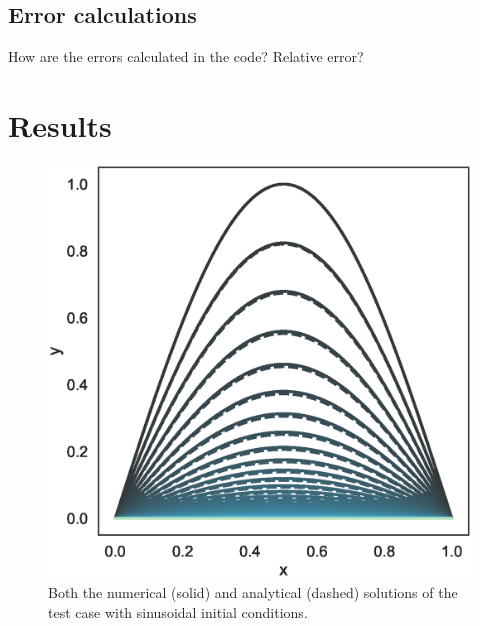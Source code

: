 \documentclass[aps,reprint]{revtex4-1}
\begin{document}
\subsection{Error calculations}
How are the errors calculated in the code? Relative error?
\section{Results} \label{sec:results}
\begin{figure}[ht]
  \centering
  \includegraphics[width=\columnwidth]{figures/sin_numeric_vs_analytical.eps}
  \caption{\label{fig:sinnumanalytic} Both the numerical (solid) and analytical
    (dashed) solutions of the test case with
    sinusoidal initial conditions. }
\end{figure}
\end{document}
